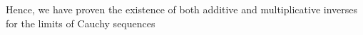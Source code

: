 \documentclass[preview]{standalone}
\begin{document}
\begin{center}
Hence, we have proven the existence of both additive and multiplicative inverses for the limits of Cauchy sequences
\end{center}
\end{document}
